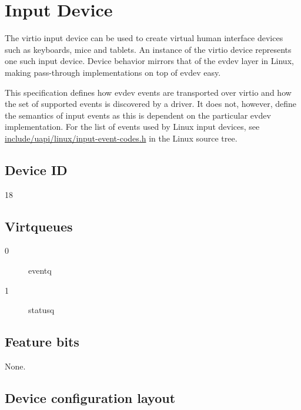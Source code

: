 \section{Input Device}\label{sec:Device Types / Input Device}

The virtio input device can be used to create virtual human interface
devices such as keyboards, mice and tablets. An instance of the virtio
device represents one such input device. Device behavior mirrors that
of the evdev layer in Linux, making pass-through implementations on top
of evdev easy.

This specification defines how evdev events are transported
over virtio and how the set of supported events is discovered by a driver.
It does not, however, define the semantics of input events as this is
dependent on the particular evdev implementation. For the list of events
used by Linux input devices, see
\href{https://git.kernel.org/cgit/linux/kernel/git/torvalds/linux.git/tree/include/uapi/linux/input-event-codes.h}{include/uapi/linux/input-event-codes.h}
in the Linux source tree.

\subsection{Device ID}\label{sec:Device Types / Input Device / Device ID}

18

\subsection{Virtqueues}\label{sec:Device Types / Input Device / Virtqueues}

\begin{description}
\item[0] eventq
\item[1] statusq
\end{description}

\subsection{Feature bits}\label{sec:Device Types / Input Device / Feature bits}

None.

\subsection{Device configuration layout}\label{sec:Device Types / Input Device / Device configuration layout}

